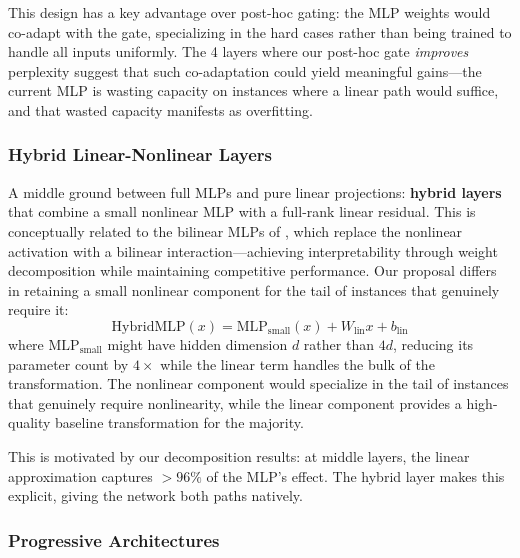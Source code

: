 \documentclass[11pt]{article}
\begin{document}
This design has a key advantage over post-hoc gating: the MLP weights would co-adapt with the gate, specializing in the hard cases rather than being trained to handle all inputs uniformly. The 4 layers where our post-hoc gate \textit{improves} perplexity suggest that such co-adaptation could yield meaningful gains---the current MLP is wasting capacity on instances where a linear path would suffice, and that wasted capacity manifests as overfitting.

\subsubsection{Hybrid Linear-Nonlinear Layers}

A middle ground between full MLPs and pure linear projections: \textbf{hybrid layers} that combine a small nonlinear MLP with a full-rank linear residual. This is conceptually related to the bilinear MLPs of \citet{dooms2025}, which replace the nonlinear activation with a bilinear interaction---achieving interpretability through weight decomposition while maintaining competitive performance. Our proposal differs in retaining a small nonlinear component for the tail of instances that genuinely require it:
\begin{equation}
\mathrm{HybridMLP}(x) = \mathrm{MLP}_{\mathrm{small}}(x) + W_{\mathrm{lin}} x + b_{\mathrm{lin}}
\end{equation}
where $\mathrm{MLP}_{\mathrm{small}}$ might have hidden dimension $d$ rather than $4d$, reducing its parameter count by $4\times$ while the linear term handles the bulk of the transformation. The nonlinear component would specialize in the tail of instances that genuinely require nonlinearity, while the linear component provides a high-quality baseline transformation for the majority.

This is motivated by our decomposition results: at middle layers, the linear approximation captures $>96\%$ of the MLP's effect. The hybrid layer makes this explicit, giving the network both paths natively.

\subsubsection{Progressive Architectures}
\end{document}
